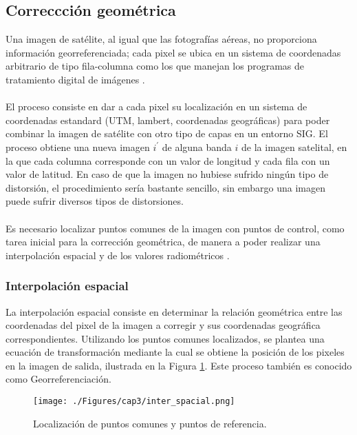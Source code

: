 \subsection{Correccci\'on geom\'etrica}\label{sec:corrGeometrica}
Una imagen de sat\'elite, al igual que las fotograf\'ias a\'ereas, no proporciona informaci\'on georreferenciada; cada pixel se ubica en un sistema de coordenadas arbitrario de tipo fila-columna como los que manejan los programas de tratamiento digital de im\'agenes \cite{deniseCultivos}.\\~\\
El proceso consiste en dar a cada pixel su localizaci\'on en un sistema de coordenadas estandard (UTM, lambert, coordenadas geogr\'aficas) para poder combinar la imagen de sat\'elite con otro tipo de capas en un entorno SIG. El proceso obtiene una nueva imagen $ i^{'} $ de alguna banda $ i $ de la imagen satelital, en la que cada columna corresponde con un valor de longitud y cada fila con un valor de latitud. En caso de que la imagen no hubiese sufrido ningún tipo de distorsi\'on, el procedimiento ser\'ia bastante sencillo, sin embargo una imagen puede sufrir diversos tipos de distorsiones.\\~\\
Es necesario localizar puntos comunes de la imagen con puntos de control, como tarea inicial para la correcci\'on geom\'etrica, de manera a poder realizar una interpolaci\'on espacial y de los valores radiom\'etricos \cite{deniseCultivos}.

\subsubsection{Interpolaci\'on espacial}
La interpolaci\'on espacial consiste en determinar la relaci\'on geom\'etrica entre las coordenadas del pixel de la imagen a corregir y sus coordenadas geogr\'afica correspondientes. Utilizando los puntos comunes localizados, se plantea una ecuaci\'on de transformaci\'on mediante la cual se obtiene la posici\'on de los pixeles en la imagen de salida, ilustrada en la Figura \ref{fig:intEspacial}. Este proceso tambi\'en es conocido como Georreferenciaci\'on.  
    \begin{figure}[H]
    	\centering
    	\texttt{[image: ./Figures/cap3/inter\_spacial.png]}
    	\caption{Localizaci\'on de puntos comunes y puntos de referencia.}
    	\label{fig:intEspacial}
    \end{figure}
    
